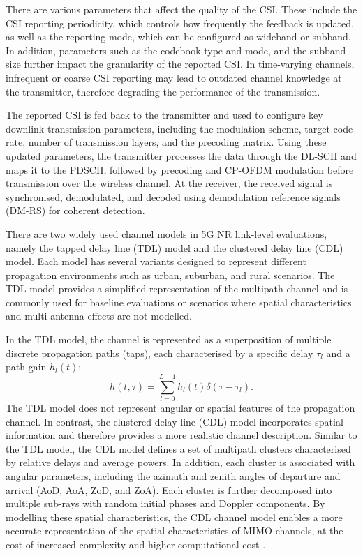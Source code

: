 \documentclass[a4paper,12pt,onecolumn]{article}
\begin{document}
	There are various parameters that affect the quality of the CSI. These include the CSI reporting periodicity, which controls how frequently the feedback is updated, as well as the reporting mode, which can be configured as wideband or subband. In addition, parameters such as the codebook type and mode, and the subband size further impact the granularity of the reported CSI. In time-varying channels, infrequent or coarse CSI reporting may lead to outdated channel knowledge at the transmitter, therefore degrading the performance of the transmission.
	
	The reported CSI is fed back to the transmitter and used to configure key downlink transmission parameters, including the modulation scheme, target code rate, number of transmission layers, and the precoding matrix. Using these updated parameters, the transmitter processes the data through the DL-SCH and maps it to the PDSCH, followed by precoding and CP-OFDM modulation before transmission over the wireless channel. At the receiver, the received signal is synchronised, demodulated, and decoded using demodulation reference signals (DM-RS) for coherent detection.

	
	There are two widely used channel models in 5G NR link-level evaluations, namely the tapped delay line (TDL) model and the clustered delay line (CDL) model. Each model has several variants designed to represent different propagation environments such as urban, suburban, and rural scenarios. The TDL model provides a simplified representation of the multipath channel and is commonly used for baseline evaluations or scenarios where spatial characteristics and multi-antenna effects are not modelled.

	In the TDL model, the channel is represented as a superposition of multiple discrete propagation paths (taps), each characterised by a specific delay $\tau_l$ and a path gain $h_l(t)$:
	\begin{equation}
		h(t, \tau)=\sum_{l=0}^{L-1}h_l(t)\delta(\tau-\tau_l).
	\end{equation}
	The TDL model does not represent angular or spatial features of the propagation channel. In contrast, the clustered delay line (CDL) model incorporates spatial information and therefore provides a more realistic channel description. Similar to the TDL model, the CDL model defines a set of multipath clusters characterised by relative delays and average powers. In addition, each cluster is associated with angular parameters, including the azimuth and zenith angles of departure and arrival (AoD, AoA, ZoD, and ZoA). Each cluster is further decomposed into multiple sub-rays with random initial phases and Doppler components. By modelling these spatial characteristics, the CDL channel model enables a more accurate representation of the spatial characteristics of MIMO channels, at the cost of increased complexity and higher computational cost \cite{ETSI_TDL_CDL}.
	
\end{document}
